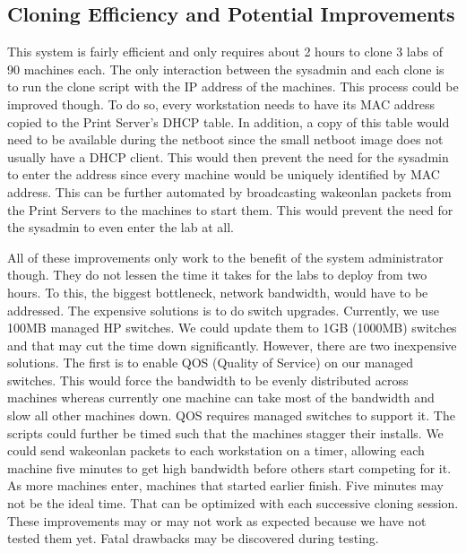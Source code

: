 \subsection{Cloning Efficiency and Potential Improvements}
This system is fairly efficient and only requires about 2 hours to clone 3 labs of 90 machines each.  The only interaction between the sysadmin and each clone is to run the clone script with the IP address of the machines.  This process could be improved though.  To do so, every workstation needs to have its MAC address copied to the Print Server's DHCP table.  In addition, a copy of this table would need to be available during the netboot since the small netboot image does not usually have a DHCP client.  This would then prevent the need for the sysadmin to enter the address since every machine would be uniquely identified by MAC address.  This can be further automated by broadcasting wakeonlan packets from the Print Servers to the machines to start them.  This would prevent the need for the sysadmin to even enter the lab at all.  

All of these improvements only work to the benefit of the system administrator though.  They do not lessen the time it takes for the labs to deploy from two hours.  To this, the biggest bottleneck, network bandwidth, would have to be addressed.  The expensive solutions is to do switch upgrades.  Currently, we use 100MB managed HP switches.  We could update them to 1GB (1000MB) switches and that may cut the time down significantly.  However, there are two inexpensive solutions.  The first is to enable QOS (Quality of Service) on our managed switches.  This would force the bandwidth to be evenly distributed across machines whereas currently one machine can take most of the bandwidth and slow all other machines down.  QOS requires managed switches to support it.   The scripts could further be timed such that the machines stagger their installs.  We could send wakeonlan packets to each workstation on a timer, allowing each machine five minutes to get high bandwidth before others start competing for it.  As more machines enter, machines that started earlier finish.  Five minutes may not be the ideal time.  That can be optimized with each successive cloning session.  These improvements may or may not work as expected because we have not tested them yet.  Fatal drawbacks may be discovered during testing.  

